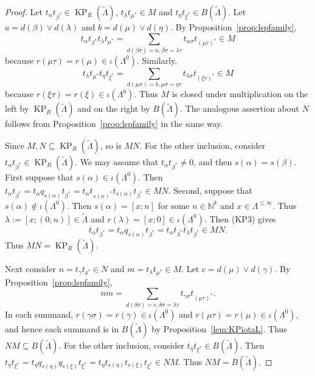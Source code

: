 \documentclass[a4paper,12pt]{amsart}
\numberwithin{equation}{section}
\theoremstyle{definition}
\theoremstyle{remark}
\begin{document}
\begin{proof}  Let $t_\alpha t_{\beta^*}\in \operatorname{KP}_R(\tilde\Lambda)$, $t_{\lambda}t_{\mu^*}\in M$  and $t_\eta t_{\xi^*}\in B(\tilde\Lambda)$. Let $a=d(\beta)\vee d(\lambda)$ and $b=d(\mu)\vee d(\eta)$. By Proposition~\ref{prop:lspfamily},
\[
t_\alpha t_{\beta^*}t_{\lambda}t_{\mu^*}=\sum_{d(\beta\sigma)=a,\beta\sigma=\lambda\tau} t_{\alpha\sigma}t_{(\mu\tau)^*}\in M
\]
because $r(\mu\tau)=r(\mu)\in \iota(\Lambda^0)$. Similarly, 
\[
t_{\lambda}t_{\mu^*}t_\eta t_{\xi^*}=\sum_{d(\mu\sigma)=b,\mu\sigma=\eta\tau}t_{\lambda\sigma}t_{(\xi\tau)^*}\in M
\]
because $r(\xi\tau)=r(\xi)\in \iota(\Lambda^0)$. 
 Thus $M$ is closed under multiplication on the left by $\operatorname{KP}_R(\tilde\Lambda)$ and on the right by $B(\tilde\Lambda)$. The analogous assertion about $N$ follows from  Proposition~\ref{prop:lspfamily} in the same way.

Since $M, N\subseteq \operatorname{KP}_R(\tilde\Lambda)$, so is $MN$. For the other inclusion, consider $t_{\alpha}t_{\beta^*}\in \operatorname{KP}_R(\tilde\Lambda)$. We may assume that $t_{\alpha}t_{\beta^*}\neq 0$, and  then $s(\alpha)=s(\beta)$. First suppose that $s(\alpha)\in \iota(\Lambda^0)$. 
Then $t_{\alpha}t_{\beta^*}=t_\alpha q_{s(\alpha)} t_{\beta^*}=t_\alpha t_{s(\alpha)^*}t_{s(\alpha)} t_{\beta^*} \in MN$. 
Second, suppose that $s(\alpha) \notin \iota(\Lambda^0)$.  Then $s(\alpha)=[x;n]$ for some $n \in {\mathbb{N}}^k$
and $x \in \Lambda^{\leq \infty}$. Thus $\lambda:=[x;(0,n)] \in {\tilde{\Lambda}}$ and $r(\lambda) = [x;0]\in \iota(\Lambda^0)$. 
Then (KP3) gives 
\[
t_\alpha t_{\beta^*} = t_\alpha q_{s(\alpha)} t_{\beta^*}=t_\alpha t_{\lambda^*} t_\lambda t_{\beta^*} \in MN.
\]
Thus $MN=\operatorname{KP}_R(\tilde\Lambda)$.
                                                       
Next consider $n=t_{\gamma}t_{\delta^*}\in N$ and  $m=t_{\lambda}t_{\mu^*}\in M$. Let $c=d(\mu)\vee d(\gamma)$.  By Proposition~\ref{prop:lspfamily},
\[
nm=\sum_{d(\delta\sigma)=c,\delta\sigma=\lambda\tau} t_{\gamma\sigma}t_{(\mu\tau)^*}.
\]
In each summand, $r(\gamma\sigma)=r(\gamma)\in\iota(\Lambda^0)$ and $r(\mu\tau)=r(\mu)\in\iota(\Lambda^0)$, and hence each summand is in $B(\tilde\Lambda)$ by Proposition~\ref{lem:KPiotaL}. Thus $NM\subseteq B(\tilde\Lambda)$. For the other inclusion, consider $t_\eta t_{\xi^*}\in B(\tilde\Lambda)$. Then $t_\eta t_{\xi^*}=t_\eta q_{s(\eta)}q_{s(\xi)}t_{\xi^*}=t_\eta t_{s(\eta)}t_{s(\xi)}t_{\xi^*}\in NM$. Thus $NM=B(\tilde\Lambda)$.
\end{proof}
\end{document}
